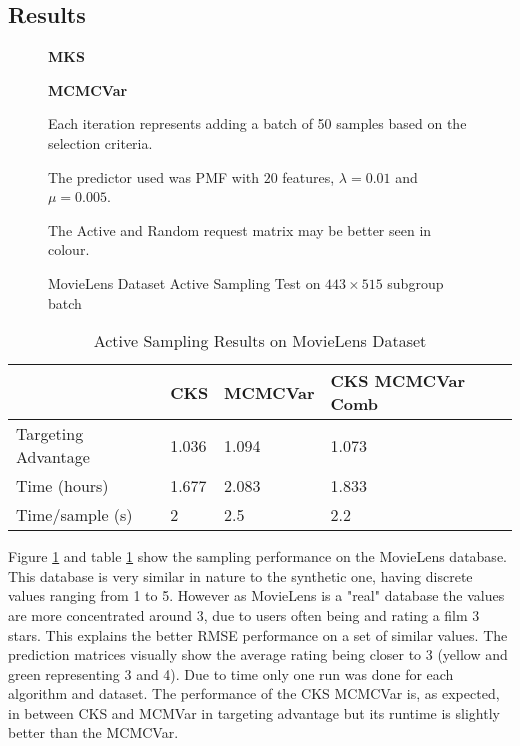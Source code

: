 \subsection{Results}

\begin{figure}[!htbp]
  \begin{center}
    \resizebox{\textwidth}{!}{}
  	\textbf{MKS}
  \end{center}
  
  \begin{center}
    \resizebox{\textwidth}{!}{}
    \textbf{MCMCVar}
  \end{center}
  
  
   Each iteration represents adding a batch of 50 samples based on the selection criteria.
  
  The predictor used was PMF with $20$ features, $\lambda = 0.01$ and $\mu = 0.005$.
  
  The Active and Random request matrix may be better seen in colour.
    
    \caption{MovieLens Dataset Active Sampling Test on $443\times 515$ subgroup batch}
    \label{fig:movielens_full_mcmcvar}
\end{figure}


\begin{table}[H]
  \begin{center}
\begin{tabular}{l|l|l|l|}
&	\textbf{CKS}	& \textbf{MCMCVar} & \textbf{CKS MCMCVar Comb} \\ \hline
Targeting Advantage	& 1.036 &	1.094 &	1.073 \\ \hline
Time (hours) &	1.677 &	2.083	&1.833 \\ \hline
Time/sample (s)	& 2	& 2.5 &	2.2 \\ \hline
\end{tabular}
\end{center}
\caption{Active Sampling Results on MovieLens Dataset}
\label{table:movielens_res}
\end{table}


Figure \ref{fig:movielens_full_mcmcvar} and table \ref{table:movielens_res} show the sampling performance on the MovieLens database. This database is very similar in nature to the synthetic one, having discrete values ranging from 1 to 5. However as MovieLens is a "real" database the values are more concentrated around 3, due to users often being and rating a film 3 stars. This explains the better RMSE performance on a set of similar values. The prediction matrices visually show the average rating being closer to 3 (yellow and green representing 3 and 4). Due to time only one run was done for each algorithm and dataset. The performance of the CKS MCMCVar is, as expected, in between CKS and MCMVar in targeting advantage but its runtime is slightly better than the MCMCVar.

